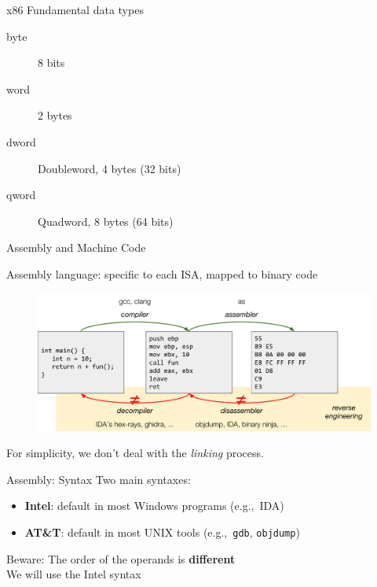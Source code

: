 \documentclass[]{beamer}
\begin{document}
 \begin{frame}{x86 Fundamental data types}

 \begin{description}
	\item[byte] 8 bits
	\item[word] 2 bytes
	\item[dword] Doubleword, 4 bytes (32 bits)
	\item[qword] Quadword, 8 bytes (64 bits)
 \end{description}

 \end{frame}
 
 \begin{frame}{Assembly and Machine Code}
 
 Assembly language: specific to each ISA, mapped to binary code
 
 	\begin{figure}
    	\includegraphics[width=\linewidth]{images/asm-disasm}
  	\end{figure}
For simplicity, we don't deal with the \emph{linking} process.
 \end{frame}

\begin{frame}{Assembly: Syntax}
	Two main syntaxes:
	\begin{itemize}
		\item \textbf{Intel}: default in most Windows programs (e.g.,~IDA)
		\item \textbf{AT\&T}: default in most UNIX tools (e.g.,~{\tt gdb}, {\tt objdump})
	\end{itemize}
	Beware: The order of the operands is \textbf{different} \\[.5em]
	We will use the Intel syntax
\end{frame}
\end{document}
